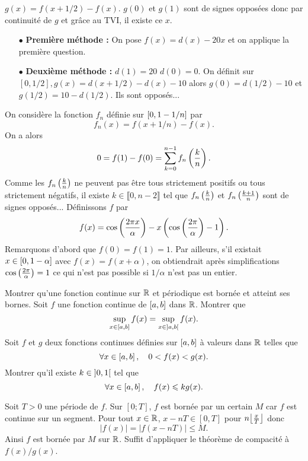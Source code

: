 \documentclass{magnolia}
\begin{document}
\begin{sol}
\begin{questions}
\question $g(x)=f(x+1/2)-f(x)$. $g(0)$ et $g(1)$ sont de signes opposées donc par continuité de $g$ et grâce au TVI, il existe ce $x$.
\question 
\begin{itemize}
\item[$\bullet$] \textbf{Première méthode :} On pose $f(x)=d(x)-20x$ et on applique la première question. 
\item[$\bullet$] \textbf{Deuxième méthode :}  $d(1)=20$ $d(0)=0$. On définit sur $[0,1/2], g(x)=d(x+1/2)-d(x)-10$ alors $g(0)=d(1/2)-10$ et $g(1/2)=10-d(1/2)$. Ils sont opposés...  
\end{itemize}
\question On considère la fonction $f_n$ définie sur $\left[0,1-1/n\right]$ par $$f_n(x)=f(x+1/n)-f(x).$$ On a alors $$0=f(1)-f(0)=\sum_{k=0}^{n-1}f_n\left(\frac{k}{n}\right).$$ Comme les $f_n\left(\frac{k}{n}\right)$ ne peuvent pas être tous strictement positifs ou tous strictement négatifs, il existe $k\in \llbracket 0, n-2\rrbracket$ tel que $f_n\left(\frac{k}{n}\right)$ et $f_n\left(\frac{k+1}{n}\right)$ sont de signes opposés...
\question Définissons $f$ par $$f(x)=\cos\left(\frac{2\pi x}{\alpha}\right)-x\left(\cos\left(\frac{2\pi}{\alpha}\right)-1\right).$$
Remarquons d'abord que $f(0)=f(1)=1$. Par ailleurs, s'il existait $x\in \left[0,1-\alpha\right]$ avec $f(x)=f(x+\alpha)$, on obtiendrait après simplifications $\cos\left(\frac{2\pi}{\alpha}\right)=1$ ce qui n'est pas possible si $1/\alpha$ n'est pas un entier.
\end{questions}

\end{sol}



\begin{questions}
\question Montrer qu'une fonction continue sur $\mathbb{R}$ et périodique est bornée et
  atteint ses bornes.
\question Soit $f$ une fonction continue de $\left[a,b\right]$ dans $\mathbb{R}$. Montrer
  que
  \[\sup_{x\in\left[a,b\right]} f(x) = \sup_{x\in\left]a,b\right[} f(x).\]
\question Soit $f$ et $g$ deux fonctions continues définies sur $\left[a,b\right]$ à
  valeurs dans $\mathbb{R}$ telles que
  \[\forall x\in\left[a,b\right] ,\quad 0<f(x)<g(x).\]
  Montrer qu'il existe $k\in\left]0,1\right[$ tel que
  \[\forall x\in\left[a,b\right] ,\quad f(x)\leqslant kg(x).\]
\end{questions}

\begin{sol}
\begin{questions}
\question Soit $T > 0$ une période de $f$.
Sur $[0 ; T]$, $f$ est bornée par un certain $M$ car $f$ est continue sur un segment. Pour tout $x\in\mathbb{R}$, $x-nT \in [0,T]$ pour $n\ent{\frac{x}{T}}$ donc
$$|f(x)| = |f(x-nT)|\leq M.$$
Ainsi $f$ est bornée par $M$ sur $\mathbb{R}$.
\question 
\question Suffit d'appliquer le théorème de compacité à $f(x)/g(x)$. 
\end{questions}
\end{sol}
\end{document}
